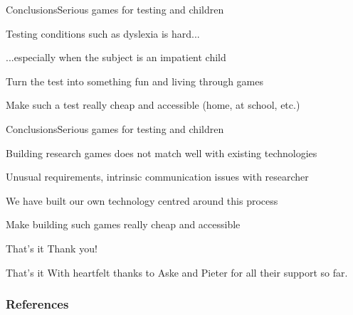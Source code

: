 \documentclass{beamer}
\begin{document}
\begin{slide}{Conclusions}{Serious games for testing and children}{
\item Testing conditions such as dyslexia is hard...
\item ...especially when the subject is an impatient child
\item Turn the test into something fun and living through games
\item Make such a test really cheap and accessible (home, at school, etc.)
}\end{slide}

\begin{slide}{Conclusions}{Serious games for testing and children}{
\item Building research games does not match well with existing technologies
\item Unusual requirements, intrinsic communication issues with researcher
\item We have built our own technology centred around this process
\item Make building such games really cheap and accessible
}\end{slide}

\begin{frame}{That's it}
\center
\fontsize{18pt}{7.2}\selectfont
Thank you!
\end{frame}

\begin{frame}{That's it}
\center
\fontsize{18pt}{7.2}\selectfont
With heartfelt thanks to Aske and Pieter for all their support so far.
\end{frame}

\begin{frame}[allowframebreaks]
\frametitle{References}


\end{frame}
\end{document}

